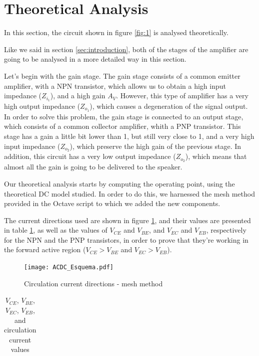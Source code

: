 \section{Theoretical Analysis}
\label{sec:theoretical}

\par In this section, the circuit shown in figure \ref{fig:1} is analysed theoretically.
\par Like we said in section \ref{sec:introduction}, both of the stages of the amplifier are going to be analysed in a more detailed way in this section.
\par Let's begin with the gain stage. The gain stage consists of a common emitter amplifier, with a NPN transistor, which allows us to obtain a high input impedance ($Z_{i_1}$), and a high gain $A_V$. However, this type of amplifier has a very high output impedance ($Z_{o_1}$), which causes a degeneration of the signal output. In order to solve this problem, the gain stage is connected to an output stage, which consists of a common collector amplifier, whith a PNP transistor. This stage has a gain a little bit lower than 1, but still very close to 1, and a very high input impedance ($Z_{o_2}$), which preserve the high gain of the previous stage. In addition, this circuit has a very low output impedance ($Z_{o_2}$), which means that almost all the gain is going to be delivered to the speaker.
\par Our theoretical analysis starts by computing the operating point, using the theoretical DC model studied. In order to do this, we harnessed the mesh method provided in the Octave script to which we added the new components.
\par The current directions used are shown in figure \ref{fig:2}, and their values are presented in table \ref{tab:currents}, as well as the values of $V_{CE}$ and $V_{BE}$, and $V_{EC}$ and $V_{EB}$, respectively for the NPN and the PNP transistors, in order to prove that they're working in the forward active region ($V_{CE} > V_{BE}$ and $V_{EC} > V_{EB}$).

\begin{figure}[H] \centering
	\texttt{[image: ACDC\_Esquema.pdf]}
	\caption{Circulation current directions - mesh method}
	\label{fig:2}
\end{figure}

\vspace{5mm}
\begin{table}[H]
	\centering
	\begin{tabularx}{0.9\textwidth} {
 	    | >{\raggedright\arraybackslash}X
  	    | >{\raggedleft\arraybackslash}X | }
	\hline
	
	\end{tabularx}
	\caption{$V_{CE}$, $V_{BE}$, $V_{EC}$, $V_{EB}$, and circulation current values}
	\label{tab:currents}
\end{table}
\vspace{5mm}


